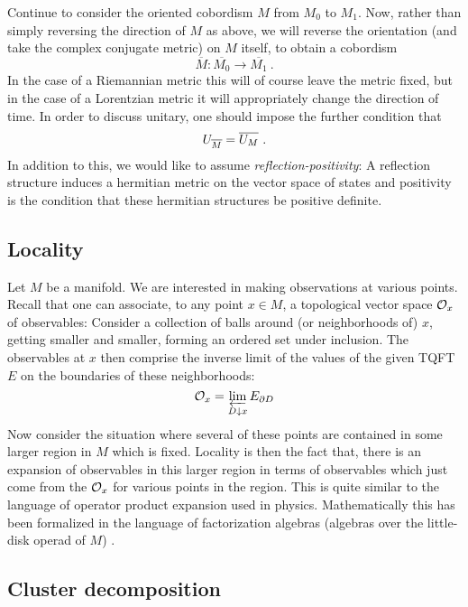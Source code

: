 Continue to consider the oriented cobordism $M$ from $M_0$ to $M_1$.
Now, rather than simply reversing the direction of $M$ as above, we will reverse the
orientation (and take the complex conjugate metric) on $M$ itself, to obtain a cobordism
\begin{equation*}
\overline{M} \colon \overline{M_0} \to \overline{M_1} \ .
\end{equation*}
In the case of a Riemannian metric this will of course leave the metric fixed, 
but in the case of a Lorentzian metric it will appropriately change the
direction of time.
In order to discuss unitary, one should impose the further condition that 
\begin{equation}
U_{\overline{M}} = \overline{U_M} \ .
\label{eq:conj}
\end{equation}
In addition to this, we would like to assume \emph{reflection-positivity}:
A reflection structure induces a hermitian metric on the vector space of states
and positivity is the condition that these hermitian structures be positive definite.

\subsection{Locality}

Let $M$ be a manifold. We are interested in making observations at various points.
Recall that one can associate, to any point $x\in M$, a topological vector space 
$\mathcal{O}_x$ of observables:
Consider a collection of balls around (or neighborhoods of) $x$, getting smaller and
smaller, forming an ordered set under inclusion. 
The observables at $x$ then comprise the inverse limit of the 
values of the given TQFT $E$ on the boundaries of these neighborhoods:
\begin{equation*}
\mathcal{O}_x = \varprojlim_{D\downarrow x} E_{\partial D}
\end{equation*}
Now consider the situation where several of these points are contained in some larger 
region in $M$ which is fixed.
Locality is then the fact that, there is an expansion of observables in this larger region
in terms of observables which just come from the $\mathcal{O}_x$ for various points in the region.
This is quite similar to the language of operator product expansion used in physics. 
Mathematically this has been formalized in the language of 
factorization algebras (algebras over the little-disk operad of $M$) \cite{CG1,CG2}.

\subsection{Cluster decomposition}

